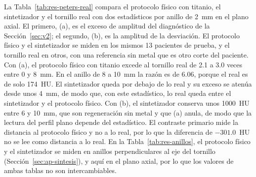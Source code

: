 La Tabla~\ref{tab:res-peters-real} compara el protocolo físico con titanio, el sintetizador y el tornillo real con dos estadísticos por anillo de 2~mm en el plano axial. El primero, (a), es el exceso de amplitud del diagnóstico de la Sección~\ref{sec:v2}; el segundo, (b), es la amplitud de la desviación. El protocolo físico y el sintetizador se miden en los mismos 13 pacientes de prueba, y el tornillo real en otros, con una referencia sin metal que es otro corte del paciente. Con (a), el protocolo físico con titanio excede al tornillo real de 2.1 a 3.0 veces entre 0 y 8~mm. En el anillo de 8 a 10~mm la razón es de 6.06, porque el real es de solo 174~HU. El sintetizador queda por debajo de lo real y su exceso se atenúa desde unos 4~mm, de modo que, con este estadístico, lo real queda entre el sintetizador y el protocolo físico. Con (b), el sintetizador conserva unos 1000~HU entre 6 y 10~mm, que son regeneración sin metal y que (a) anula, de modo que la lectura del perfil plano depende del estadístico. El contraste primario mide la distancia al protocolo físico y no a lo real, por lo que la diferencia de $-301.0$~HU no se lee como distancia a lo real. En la Tabla~\ref{tab:res-anillos}, el protocolo físico y el sintetizador se miden en anillos perpendiculares al eje del tornillo (Sección~\ref{sec:ap-sintesis}), y aquí en el plano axial, por lo que los valores de ambas tablas no son intercambiables.

